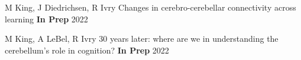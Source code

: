 

\begin{cventries}

  \cventry
    {M King, J Diedrichsen, R Ivry} %
    {Changes in cerebro-cerebellar connectivity across learning} %
    {\textbf{In Prep}} %
    {2022} %
    {}
    
  \cventry
    {M King, A LeBel, R Ivry} %
    {30 years later: where are we in understanding the cerebellum's role in cognition?} %
    {\textbf{In Prep}} %
    {2022} %
    {}


\end{cventries}



